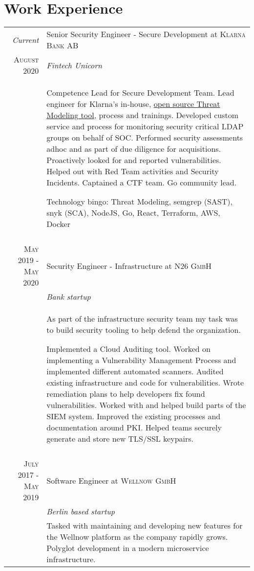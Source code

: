 \documentclass[a4paper,10pt]{article}
\begin{document}
\section{Work Experience}
\begin{tabular}{r|p{11cm}}

 \emph{Current} & Senior Security Engineer - Secure Development at \textsc{Klarna Bank AB}\\
 \textsc{August 2020} & \emph{Fintech Unicorn}\\
 &\footnotesize{
    Competence Lead for Secure Development Team. 
    Lead engineer for Klarna's in-house, \href{https://github.com/klarna-incubator/gram}{open source Threat Modeling tool}, process and trainings.  
    Developed custom service and process for monitoring security critical LDAP groups on behalf of SOC.
    Performed security assessments adhoc and as part of due diligence for acquisitions. 
    Proactively looked for and reported vulnerabilities. Helped out with Red Team activities and Security Incidents.
    Captained a CTF team. Go community lead. 



    Technology bingo: Threat Modeling, semgrep (SAST), snyk (SCA), NodeJS, Go, React, Terraform, AWS, Docker
 }\\ \multicolumn{2}{c}{} \\
    
  \textsc{May 2019 - May 2020} & Security Engineer - Infrastructure at \textsc{N26 GmbH}\\
 &\emph{Bank startup}\\
 &\footnotesize{     
 As part of the infrastructure security team my task was to build security tooling to help defend the organization. 
 
 Implemented a Cloud Auditing tool.
 Worked on implementing a Vulnerability Management Process and implemented different automated scanners.
 Audited existing infrastructure and code for vulnerabilities. Wrote remediation plans to help developers fix found vulnerabilities.
 Worked with and helped build parts of the SIEM system.
 Improved the existing processes and documentation around PKI. Helped teams securely generate and store new TLS/SSL keypairs.
 }\\ \multicolumn{2}{c}{} \\

 \textsc{July 2017 - May 2019} & Software Engineer at \textsc{Wellnow GmbH}\\ 
 &\emph{Berlin based startup}\\
 &\footnotesize{
 Tasked with maintaining and developing new features for the Wellnow platform as the company rapidly grows. 
 Polyglot development in a modern microservice infrastructure. 

}
\end{tabular}
\end{document}
